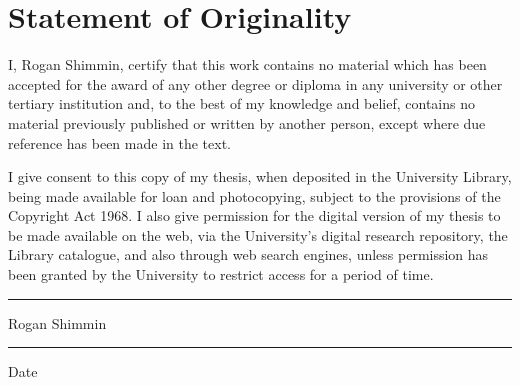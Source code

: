 \chapter*{Statement of Originality}
{}

\vfill



I, Rogan Shimmin, certify that this work contains no material which has been accepted for the award of any other degree or diploma in any university or other tertiary institution and, to the best of my knowledge and belief, contains no material previously published or written by another person, except where due reference has been made in the text. 

I give consent to this copy of my thesis, when deposited in the University Library, being made available for loan and photocopying, subject to the provisions of the Copyright Act 1968. I also give permission for the digital version of my thesis to be made available on the web, via the University's digital research repository, the Library catalogue, and also through web search engines, unless permission has been granted by the University to restrict access for a period of time.\\[2cm]

\rule{5cm}{0.5mm}

Rogan Shimmin\\[1cm]

\rule{5cm}{0.5mm}

Date

\vfill